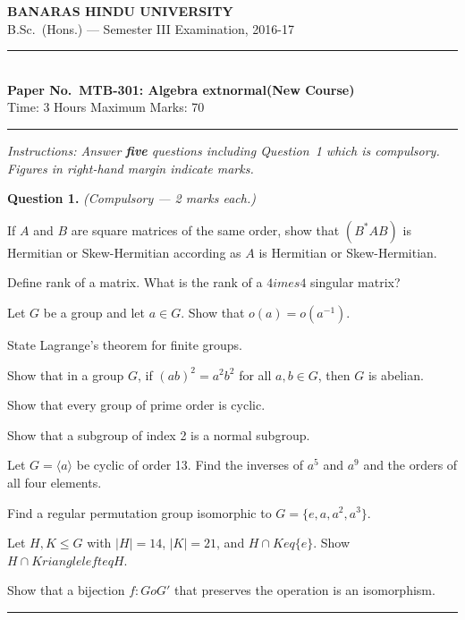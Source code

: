 \documentclass[11pt,a4paper]{article}
\begin{document}
\begin{center}
  {\large\bfseries BANARAS HINDU UNIVERSITY}\\[2pt]
  {\normalsize B.Sc.\ (Hons.) --- Semester III Examination, 2016-17}\\[6pt]
  \rule{0.8\linewidth}{0.5pt}\\[6pt]
  {\large\bfseries Paper No.\ MTB-301: Algebra  extnormal{(New Course)}}\\[4pt]
  {\normalsize Time: 3 Hours \hfill Maximum Marks: 70}
\end{center}
\rule{\linewidth}{0.4pt}
\smallskip



\noindent   \textit{Instructions: Answer   \textbf{five} questions including Question~1 which is compulsory. Figures in right-hand margin indicate marks.}
\bigskip




\noindent   \textbf{Question 1.}   \textit{(Compulsory --- 2 marks each.)}

\begin{parts}
  \item If $A$ and $B$ are square matrices of the same order, show that $(B^*AB)$ is Hermitian or Skew-Hermitian according as $A$ is Hermitian or Skew-Hermitian.
  \item Define rank of a matrix. What is the rank of a $4 imes4$ singular matrix?
  \item Let $G$ be a group and let $a\in G$. Show that $o(a)=o(a^{-1})$.
  \item State Lagrange's theorem for finite groups.
  \item Show that in a group $G$, if $(ab)^2=a^2b^2$ for all $a,b\in G$, then $G$ is abelian.
  \item Show that every group of prime order is cyclic.
  \item Show that a subgroup of index 2 is a normal subgroup.
  \item Let $G=\langle a\rangle$ be cyclic of order 13. Find the inverses of $a^5$ and $a^9$ and the orders of all four elements.
  \item Find a regular permutation group isomorphic to $G=\{e,a,a^2,a^3\}$.
  \item Let $H,K\leq G$ with $|H|=14$, $|K|=21$, and $H\cap K
eq\{e\}$. Show $H\cap K rianglelefteq H$.
  \item Show that a bijection $f:G o G'$ that preserves the operation is an isomorphism.
\end{parts}
\medskip\rule{\linewidth}{0.2pt}
\end{document}
